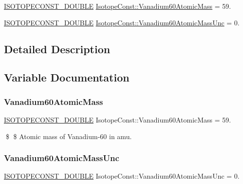\begin{DoxyCompactItemize}
\item 
\mbox{\hyperlink{group___isotope_const-_macros_ga8f45a7272ce02c0b4c65c44636ed719a}{I\+S\+O\+T\+O\+P\+E\+C\+O\+N\+S\+T\+\_\+\+D\+O\+U\+B\+LE}} \mbox{\hyperlink{group___isotope_const-_vanadium-_v60_gafb18baeb73eb5c69d04026f1a74d1a23}{Isotope\+Const\+::\+Vanadium60\+Atomic\+Mass}} = 59.
\item 
\mbox{\hyperlink{group___isotope_const-_macros_ga8f45a7272ce02c0b4c65c44636ed719a}{I\+S\+O\+T\+O\+P\+E\+C\+O\+N\+S\+T\+\_\+\+D\+O\+U\+B\+LE}} \mbox{\hyperlink{group___isotope_const-_vanadium-_v60_ga9b3b614537fa06a2df626158f3045535}{Isotope\+Const\+::\+Vanadium60\+Atomic\+Mass\+Unc}} = 0.
\end{DoxyCompactItemize}


\subsection{Detailed Description}


\subsection{Variable Documentation}
\mbox{\label{group___isotope_const-_vanadium-_v60_gafb18baeb73eb5c69d04026f1a74d1a23}} 
\subsubsection{\texorpdfstring{Vanadium60\+Atomic\+Mass}{Vanadium60AtomicMass}}
{\footnotesize\ttfamily \mbox{\hyperlink{group___isotope_const-_macros_ga8f45a7272ce02c0b4c65c44636ed719a}{I\+S\+O\+T\+O\+P\+E\+C\+O\+N\+S\+T\+\_\+\+D\+O\+U\+B\+LE}} Isotope\+Const\+::\+Vanadium60\+Atomic\+Mass = 59.}

\$ \$ Atomic mass of Vanadium-\/60 in amu. \mbox{\label{group___isotope_const-_vanadium-_v60_ga9b3b614537fa06a2df626158f3045535}} 
\subsubsection{\texorpdfstring{Vanadium60\+Atomic\+Mass\+Unc}{Vanadium60AtomicMassUnc}}
{\footnotesize\ttfamily \mbox{\hyperlink{group___isotope_const-_macros_ga8f45a7272ce02c0b4c65c44636ed719a}{I\+S\+O\+T\+O\+P\+E\+C\+O\+N\+S\+T\+\_\+\+D\+O\+U\+B\+LE}} Isotope\+Const\+::\+Vanadium60\+Atomic\+Mass\+Unc = 0.}

